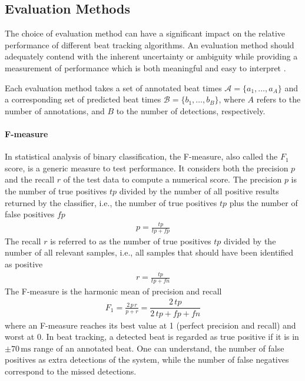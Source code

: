 \documentclass{scrartcl}
\begin{document}
\subsection{Evaluation Methods}

The choice of evaluation method can have a significant impact on the relative performance of different beat tracking algorithms. An evaluation method should adequately contend with the inherent uncertainty or ambiguity while providing a measurement of performance which is both meaningful and easy to interpret \cite{Davies2009b}. 

Each evaluation method takes a set of annotated beat times $\mathcal A = \{a_1, \dots, a_A\}$ and a corresponding set of predicted beat times $\mathcal B = \{b_1, \dots, b_B\}$, where $A$ refers to the number of annotations, and $B$ to the number of detections, respectively.


\paragraph{F-measure} 
In statistical analysis of binary classification, the F-measure, also called the $F_1$ score, is a generic measure to test performance. It considers both the precision $p$ and the recall $r$ of the test data to compute a numerical score. The precision $p$ is the number of true positives $tp$ divided by the number of all positive results returned by the classifier, i.e., the number of true positives $tp$ plus the number of false positives $fp$
\begin{align}
p = \frac{tp}{tp + fp}
\end{align} 
The recall $r$ is referred to as the number of true positives $tp$ divided by the number of all relevant samples, i.e., all samples that should have been identified as positive
\begin{align}
r = \frac{tp}{tp + fn}
\end{align} 
The F-measure is the harmonic mean of precision and recall
\begin{align}
F_1=  \frac{2\,p\, r}{p +r} = \dfrac{2\, tp}{2\, tp + fp + fn}
\end{align} 
where an F-measure reaches its best value at 1 (perfect precision and recall) and worst at 0. In beat tracking, a detected beat is regarded as true positive if it is in $\pm 70\,\text{ms}$ range of an annotated beat. One can understand, the number of false positives as extra detections of the system, while the number of false negatives correspond to the missed detections.
\end{document}

